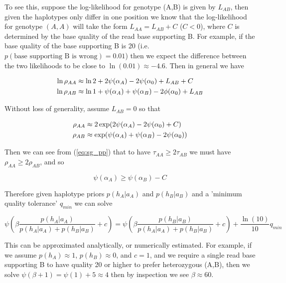 \documentclass{article}
\begin{document}
To see this, suppose the log-likelihood for genotype (A,B) is given by $L_{AB}$, then given the haplotypes only differ in one position we know that the log-likelihood for genotype $(A,A)$ will take the form $L_{AA} = L_{AB} + C$ ($C < 0$), where $C$ is determined by the base quality of the read base supporting B. For example, if the base quality of the base supporting B is 20 (i.e. $p(\text{base supporting B is wrong}) = 0.01$) then we expect the difference between the two likelihoods to be close to $\ln(0.01) \approx -4.6$. Then in general we have

\begin{align}
\ln \rho_{AA} &\approx \ln 2 + 2 \psi(\alpha_A) - 2 \psi(\alpha_0) + L_{AB} + C \notag \\
\ln \rho_{AB} &\approx \ln 1 + \psi(\alpha_A) + \psi(\alpha_B) - 2 \phi(\alpha_0) + L_{AB} \notag
\end{align}

Without loss of generality, assume $L_{AB} = 0$ so that

\begin{align}
\rho_{AA} &\approx 2 \exp(2 \psi(\alpha_A) - 2 \psi(\alpha_0) + C) \notag \\
\rho_{AB} &\approx \exp(\psi(\alpha_A) + \psi(\alpha_B) - 2 \psi(\alpha_0)) \notag
\end{align}

Then we can see from (\ref{eq:sg_pp}) that to have $\tau_{AA} \ge 2 \tau_{AB}$ we must have $\rho_{AA} \ge 2 \rho_{AB}$, and so

\begin{equation}
    \psi(\alpha_A) \ge \psi(\alpha_B) - C
\end{equation}

Therefore given haplotype priors $p(h_A | a_A)$ and $p(h_B | a_B)$ and a 'minimum quality tolerance' $q_{min}$ we can solve

\begin{equation}
    \psi \left(\beta \frac{p(h_A | a_A)}{p(h_A | a_A) + p(h_B | a_B)} + c \right) = \psi \left(\beta \frac{p(h_B | a_B)}{p(h_A | a_A) + p(h_B | a_B)} + c \right) + \frac{\ln(10)}{10}q_{min}
\end{equation}

This can be approximated analytically, or numerically estimated. For example, if we assume $p(h_A) \approx 1$, $p(h_B) \approx 0$, and $c = 1$, and we require a single read base supporting B to have quality 20 or higher to prefer heterozygous (A,B), then we solve $\psi(\beta + 1) = \psi(1) + 5 \approx 4$ then by inspection we see $\beta \approx 60$.
\end{document}
